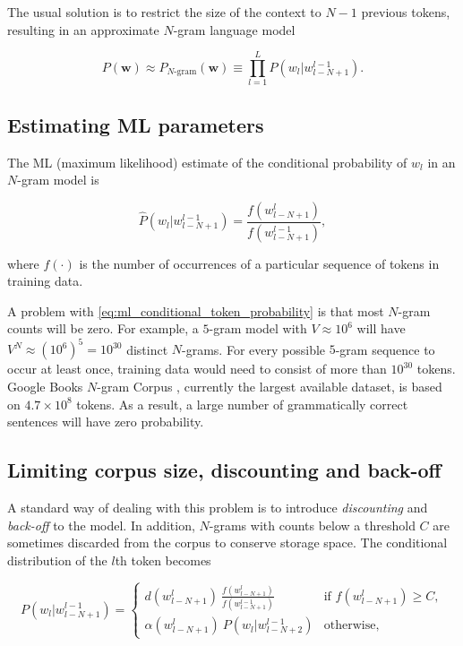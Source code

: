\documentclass[draft]{IIBproject}
\begin{document}
The usual solution is to restrict the size of the context to $N{-}1$ previous tokens, resulting in an approximate $N$-gram language model

\begin{equation}
\label{eq:ngram_string_probability}
P(\mathbf w) \approx P_{\text{$N$-gram}}(\mathbf w) \equiv \prod_{l=1}^{L} P( w_l | w_{l-N+1}^{l-1} ).
\end{equation}

\FloatBarrier
\subsection{Estimating ML parameters}

The ML (maximum likelihood) estimate of the conditional probability of $w_l$ in an $N$-gram model is

\begin{equation}
\label{eq:ml_conditional_token_probability}
\hat P( w_l | w_{l-N+1}^{l-1} ) = \frac {f(w_{l-N+1}^l)} {f(w_{l-N+1}^{l-1})},
\end{equation}

where $f(\cdot)$ is the number of occurrences of a particular sequence of tokens in training data.

A problem with \cref{eq:ml_conditional_token_probability} is that most $N$-gram counts will be zero. For example, a $5$-gram model with $V \approx 10^6$ will have $V^N \approx \left( 10^6 \right)^5 = 10^{30}$ distinct $N$-grams. For every possible $5$-gram sequence to occur at least once, training data would need to consist of more than $10^{30}$ tokens. Google Books $N$-gram Corpus \cite{googlengrams2011}, currently the largest available dataset, is based on $4.7 \times 10^{8}$ tokens. As a result, a large number of grammatically correct sentences will have zero probability.

\FloatBarrier
\subsection{Limiting corpus size, discounting and back-off}

A standard way of dealing with this problem is to introduce \emph{discounting} and \emph{back-off} to the model. In addition, $N$-grams with counts below a threshold $C$ are sometimes discarded from the corpus to conserve storage space. The conditional distribution of the $l$th token becomes

\begin{equation}
	\label{eq:conditional_token_probability_with_backoff}
	P( w_l | w_{l-N+1}^{l-1} ) =
	\begin{cases}
		d (w_{l-N+1}^l) ~ \frac {f\left(w_{l-N+1}^l \right)} {f\left(w_{l-N+1}^{l-1} \right)} & \text{if $f(w_{l-N+1}^l) \ge C$},\\
		\alpha (w_{l-N+1}^l) ~ P( w_l | w_{l-N+2}^{l-1} ) & \text{otherwise},
	\end{cases}
\end{equation}
\end{document}
